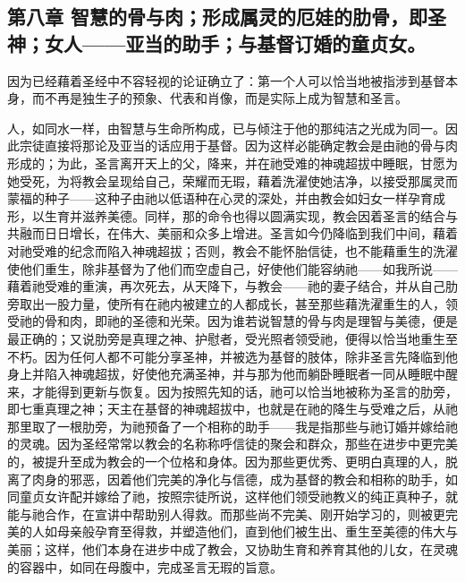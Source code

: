 
\subsection{第八章 智慧的骨与肉；形成属灵的厄娃的肋骨，即圣神；女人——亚当的助手；与基督订婚的童贞女。}

因为已经藉着圣经中不容轻视的论证确立了：第一个人可以恰当地被指涉到基督本身，而不再是独生子的预象、代表和肖像，而是实际上成为智慧和圣言。\par

人，如同水一样，由智慧与生命所构成，已与倾注于他的那纯洁之光成为同一。因此宗徒直接将那论及亚当的话应用于基督。因为这样必能确定教会是由祂的骨与肉形成的；为此，圣言离开天上的父，降来，并在祂受难的神魂超拔中睡眠，甘愿为她受死，为将教会呈现给自己，荣耀而无瑕，藉着洗濯使她洁净，以接受那属灵而蒙福的种子——这种子由祂以低语种在心灵的深处，并由教会如妇女一样孕育成形，以生育并滋养美德。同样，那的命令也得以圆满实现，教会因着圣言的结合与共融而日日增长，在伟大、美丽和众多上增进。圣言如今仍降临到我们中间，藉着对祂受难的纪念而陷入神魂超拔；否则，教会不能怀胎信徒，也不能藉重生的洗濯使他们重生，除非基督为了他们而空虚自己，好使他们能容纳祂——如我所说——藉着祂受难的重演，再次死去，从天降下，与教会——祂的妻子结合，并从自己肋旁取出一股力量，使所有在祂内被建立的人都成长，甚至那些藉洗濯重生的人，领受祂的骨和肉，即祂的圣德和光荣。因为谁若说智慧的骨与肉是理智与美德，便是最正确的；又说肋旁是真理之神、护慰者，受光照者领受祂，便得以恰当地重生至不朽。因为任何人都不可能分享圣神，并被选为基督的肢体，除非圣言先降临到他身上并陷入神魂超拔，好使他充满圣神，并与那为他而躺卧睡眠者一同从睡眠中醒来，才能得到更新与恢复。因为按照先知的话，祂可以恰当地被称为圣言的肋旁，即七重真理之神；天主在基督的神魂超拔中，也就是在祂的降生与受难之后，从祂那里取了一根肋旁，为祂预备了一个相称的助手——我是指那些与祂订婚并嫁给祂的灵魂。因为圣经常常以教会的名称称呼信徒的聚会和群众，那些在进步中更完美的，被提升至成为教会的一个位格和身体。因为那些更优秀、更明白真理的人，脱离了肉身的邪恶，因着他们完美的净化与信德，成为基督的教会和相称的助手，如同童贞女许配并嫁给了祂，按照宗徒所说，这样他们领受祂教义的纯正真种子，就能与祂合作，在宣讲中帮助别人得救。而那些尚不完美、刚开始学习的，则被更完美的人如母亲般孕育至得救，并塑造他们，直到他们被生出、重生至美德的伟大与美丽；这样，他们本身在进步中成了教会，又协助生育和养育其他的儿女，在灵魂的容器中，如同在母腹中，完成圣言无瑕的旨意。\par

